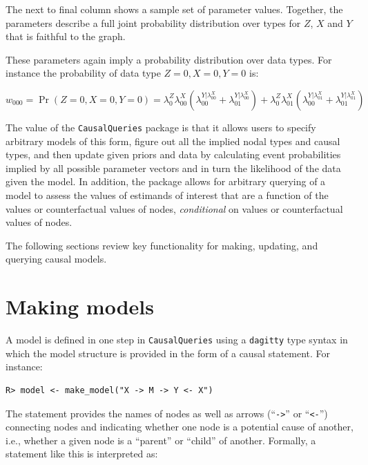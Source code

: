 \documentclass[
  11pt,
  article]{jss}
\begin{document}
The next to final column shows a sample set of parameter values.
Together, the parameters describe a full joint probability distribution
over types for \(Z\), \(X\) and \(Y\) that is faithful to the graph.

These parameters again imply a probability distribution over data types.
For instance the probability of data type \(Z=0, X=0, Y=0\) is:

\[w_{000}=\Pr(Z=0, X=0, Y=0) = \lambda^Z_0\lambda^X_{00}(\lambda^{Y|\lambda^X_{00}}_{00}+\lambda^{Y|\lambda^X_{00}}_{01}) + \lambda^Z_0\lambda^X_{01}(\lambda^{Y|\lambda^X_{01}}_{00}+\lambda^{Y|\lambda^X_{01}}_{01})\]

The value of the \texttt{CausalQueries} package is that it allows users
to specify arbitrary models of this form, figure out all the implied
nodal types and causal types, and then update given priors and data by
calculating event probabilities implied by all possible parameter
vectors and in turn the likelihood of the data given the model. In
addition, the package allows for arbitrary querying of a model to assess
the values of estimands of interest that are a function of the values or
counterfactual values of nodes, \emph{conditional} on values or
counterfactual values of nodes.

The following sections review key functionality for making, updating,
and querying causal models.

\section{Making models}\label{sec-make}

A model is defined in one step in \texttt{CausalQueries} using a
\texttt{dagitty} type syntax \citep{textor_robust_2016} in which the
model structure is provided in the form of a causal statement. For
instance:

\begin{verbatim}
R> model <- make_model("X -> M -> Y <- X")
\end{verbatim}

The statement provides the names of nodes as well as arrows
(``\texttt{-\textgreater{}}'' or ``\texttt{\textless{}-}'') connecting
nodes and indicating whether one node is a potential cause of another,
i.e., whether a given node is a ``parent'' or ``child'' of another.
Formally, a statement like this is interpreted as:
\end{document}
